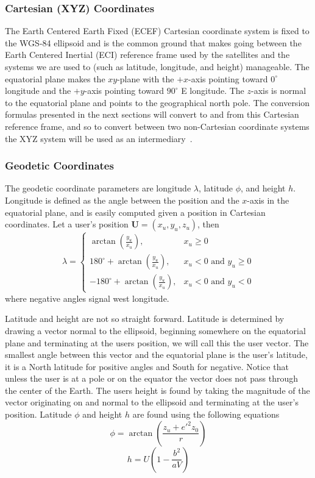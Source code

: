 \begin{bibunit}
\subsubsection{Cartesian (XYZ) Coordinates}
The Earth Centered Earth Fixed (ECEF) Cartesian coordinate system is fixed to the WGS-84 ellipsoid and is the common ground that makes going between the Earth Centered Inertial (ECI) reference frame used by the satellites and the systems we are used to (such as latitude, longitude, and height) manageable. The equatorial plane makes the $xy$-plane with the $+x$-axis pointing toward $0^{\circ}$ longitude and the $+y$-axis pointing toward $90^{\circ}$ E longitude. The $z$-axis is normal to the equatorial plane and points to the geographical north pole. The conversion formulas presented in the next sections will convert to and from this Cartesian reference frame, and so to convert between two non-Cartesian coordinate systems the XYZ system will be used as an intermediary~\cite[p. 24]{kaplan:ugpspa}.
\subsubsection{Geodetic Coordinates}
The geodetic coordinate parameters are longitude $\lambda$, latitude $\phi$, and height $h$. Longitude is defined as the angle between the position and the $x$-axis in the equatorial plane, and is easily computed given a position in Cartesian coordinates. Let a user's position $\mathbf{U}=(x_{u},y_{u},z_{u})$, then
\[ \lambda = \left \{ \begin{array}{ll}
\arctan \left( \frac{y_{u}}{x_{u}} \right), & \mbox{$x_{u} \geq 0$} \\
180^{\circ} + \arctan \left( \frac{y_{u}}{x_{u}} \right), & \mbox{$x_{u} < 0$ and $y_{u} \geq 0$} \\
-180^{\circ} +\arctan \left( \frac{y_{u}}{x_{u}} \right), & \mbox{$x_{u} < 0$ and $y_{u} < 0$}
\end{array}
\right. \]
where negative angles signal west longitude.

Latitude and height are not so straight forward. Latitude is determined by drawing a vector normal to the ellipsoid, beginning somewhere on the equatorial plane and terminating at the users position, we will call this the user vector. The smallest angle between this vector and the equatorial plane is the user's latitude, it is a North latitude for positive angles and South for negative. Notice that unless the user is at a pole or on the equator the vector does not pass through the center of the Earth. The users height is found by taking the magnitude of the vector originating on and normal to the ellipsoid and terminating at the user's position. Latitude $\phi$ and height $h$ are found using the following equations
\[ \phi = \arctan\left(\frac{z_{u}+e'^{2}z_{0}}{r}\right) \]
\[ h = U \left(1-\frac{b^{2}}{aV}\right) \]


\end{bibunit}
